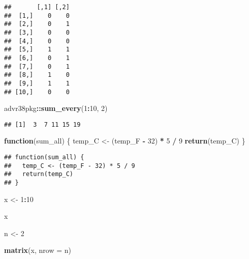 \documentclass[]{article}
\newenvironment{Shaded}{\begin{snugshade}}{\end{snugshade}}
\newcommand{\ControlFlowTok}[1]{\textcolor[rgb]{0.13,0.29,0.53}{\textbf{#1}}}
\newcommand{\DataTypeTok}[1]{\textcolor[rgb]{0.13,0.29,0.53}{#1}}
\newcommand{\DecValTok}[1]{\textcolor[rgb]{0.00,0.00,0.81}{#1}}
\newcommand{\KeywordTok}[1]{\textcolor[rgb]{0.13,0.29,0.53}{\textbf{#1}}}
\newcommand{\NormalTok}[1]{#1}
\newcommand{\OperatorTok}[1]{\textcolor[rgb]{0.81,0.36,0.00}{\textbf{#1}}}
\newcommand{\StringTok}[1]{\textcolor[rgb]{0.31,0.60,0.02}{#1}}
\begin{document}
\begin{verbatim}
##       [,1] [,2]
##  [1,]    0    0
##  [2,]    0    1
##  [3,]    0    0
##  [4,]    0    0
##  [5,]    1    1
##  [6,]    0    1
##  [7,]    0    1
##  [8,]    1    0
##  [9,]    1    1
## [10,]    0    0
\end{verbatim}

\begin{Shaded}
\begin{Highlighting}[]
\NormalTok{advr38pkg}\OperatorTok{::}\KeywordTok{sum_every}\NormalTok{(}\DecValTok{1}\OperatorTok{:}\DecValTok{10}\NormalTok{, }\DecValTok{2}\NormalTok{)}
\end{Highlighting}
\end{Shaded}

\begin{verbatim}
## [1]  3  7 11 15 19
\end{verbatim}

\begin{Shaded}
\begin{Highlighting}[]
\ControlFlowTok{function}\NormalTok{(sum_all) \{}
\NormalTok{  temp_C <-}\StringTok{ }\NormalTok{(temp_F }\OperatorTok{-}\StringTok{ }\DecValTok{32}\NormalTok{) }\OperatorTok{*}\StringTok{ }\DecValTok{5} \OperatorTok{/}\StringTok{ }\DecValTok{9}
  \KeywordTok{return}\NormalTok{(temp_C)}
\NormalTok{\}}
\end{Highlighting}
\end{Shaded}

\begin{verbatim}
## function(sum_all) {
##   temp_C <- (temp_F - 32) * 5 / 9
##   return(temp_C)
## }
\end{verbatim}

\begin{Shaded}
\begin{Highlighting}[]
\NormalTok{x <-}\StringTok{ }\DecValTok{1}\OperatorTok{:}\DecValTok{10}
\end{Highlighting}
\end{Shaded}

x

\begin{Shaded}
\begin{Highlighting}[]
\NormalTok{n <-}\StringTok{ }\DecValTok{2}
\end{Highlighting}
\end{Shaded}

\begin{Shaded}
\begin{Highlighting}[]
\KeywordTok{matrix}\NormalTok{(x, }\DataTypeTok{nrow =}\NormalTok{ n)}
\end{Highlighting}
\end{Shaded}
\end{document}

